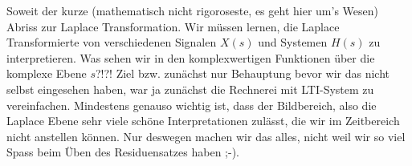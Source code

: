 Soweit der kurze (mathematisch nicht rigoroseste, es geht hier um's Wesen)
Abriss zur Laplace Transformation.
Wir müssen lernen, die Laplace Transformierte von verschiedenen
Signalen $X(s)$ und Systemen $H(s)$ zu interpretieren. Was sehen wir in den
komplexwertigen Funktionen über die komplexe Ebene $s$?!?!
Ziel bzw. zunächst nur Behauptung bevor wir das nicht selbst eingesehen haben,
war ja zunächst die Rechnerei mit LTI-System zu vereinfachen.
Mindestens genauso wichtig ist, dass der Bildbereich, also die Laplace Ebene
sehr viele schöne Interpretationen zulässt, die wir im Zeitbereich nicht
anstellen können. Nur deswegen machen wir das alles, nicht weil wir so viel
Spass beim Üben des Residuensatzes haben ;-).














\newpage
